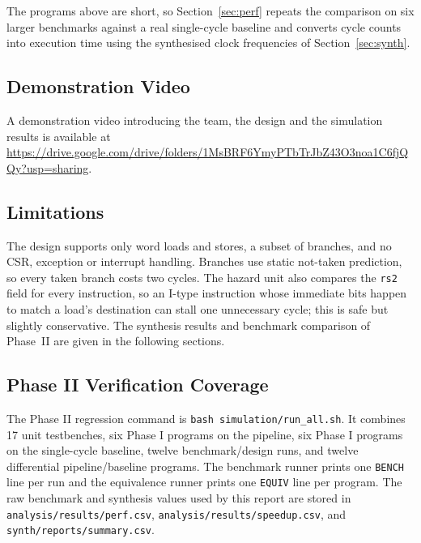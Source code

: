 The programs above are short, so Section~\ref{sec:perf} repeats the comparison on six larger benchmarks against a real single-cycle baseline and converts cycle counts into execution time using the synthesised clock frequencies of Section~\ref{sec:synth}.

\subsection*{Demonstration Video}
A demonstration video introducing the team, the design and the simulation results is
available at \url{https://drive.google.com/drive/folders/1MsBRF6YmyPTbTrJbZ43O3noa1C6fjQQy?usp=sharing}.

\subsection*{Limitations}
The design supports only word loads and stores, a subset of branches, and no CSR,
exception or interrupt handling. Branches use static not-taken prediction, so every taken
branch costs two cycles. The hazard unit also compares the \texttt{rs2} field for every
instruction, so an I-type instruction whose immediate bits happen to match a load's
destination can stall one unnecessary cycle; this is safe but slightly conservative.
The synthesis results and benchmark comparison of Phase~II are given in the following sections.


\subsection{Phase II Verification Coverage}
\label{sec:phase2-verification}
The Phase II regression command is
\texttt{bash simulation/run\_all.sh}. It combines 17 unit testbenches,
six Phase I programs on the pipeline, six Phase I programs on the single-cycle
baseline, twelve benchmark/design runs, and twelve differential
pipeline/baseline programs. The benchmark runner prints one
\texttt{BENCH} line per run and the equivalence runner prints one
\texttt{EQUIV} line per program. The raw benchmark and synthesis values used
by this report are stored in \texttt{analysis/results/perf.csv},
\texttt{analysis/results/speedup.csv}, and \texttt{synth/reports/summary.csv}.

